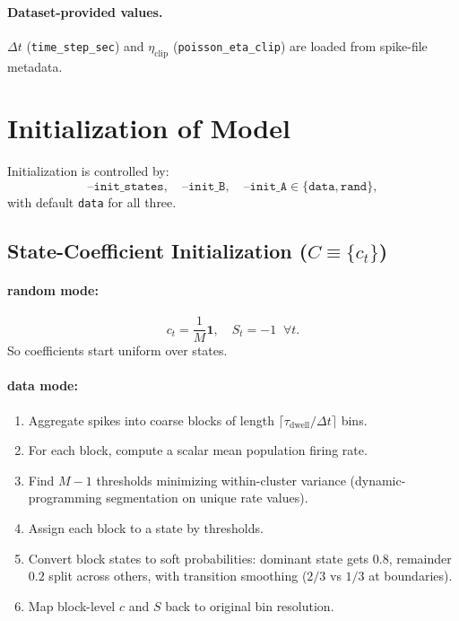 \documentclass[11pt]{article}
\begin{document}
\paragraph{Dataset-provided values.}
\(\Delta t\) (\texttt{time\_step\_sec}) and \(\eta_{\mathrm{clip}}\)
(\texttt{poisson\_eta\_clip}) are loaded from spike-file metadata.

\section{Initialization of Model}
\label{sec:init}

Initialization is controlled by:
\[
\texttt{--init\_states},\quad \texttt{--init\_B},\quad  \texttt{--init\_A}
\in \{\texttt{data},\texttt{rand}\},
\]
with default \texttt{data} for all three.

\subsection{State-Coefficient Initialization (\(C\equiv\{c_t\}\))}

\paragraph{random mode:}
\[
c_t = \frac{1}{M}\mathbf{1},\quad S_t=-1 \;\; \forall t.
\]
So coefficients start uniform over states.

\paragraph{data mode:}
\begin{enumerate}
  \item Aggregate spikes into coarse blocks of length
  \(\lceil\tau_{\mathrm{dwell}}/\Delta t\rceil\) bins.
  \item For each block, compute a scalar mean population firing rate.
  \item Find \(M-1\) thresholds minimizing within-cluster variance
  (dynamic-programming segmentation on unique rate values).
  \item Assign each block to a state by thresholds.
  \item Convert block states to soft probabilities:
  dominant state gets \(0.8\), remainder \(0.2\) split across others,
  with transition smoothing (\(2/3\) vs \(1/3\) at boundaries).
  \item Map block-level \(c\) and \(S\) back to original bin resolution.
\end{enumerate}
\end{document}
